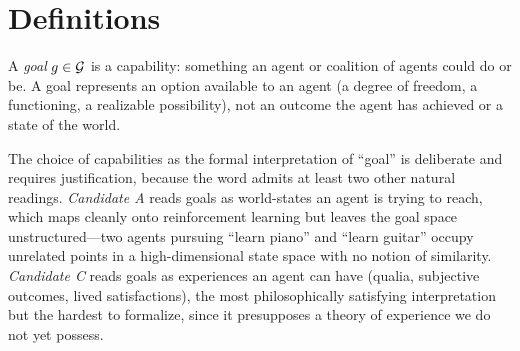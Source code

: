 %
%
%

\section{Definitions}
\label{sec:definitions}


\begin{definition}[Goal]
\label{def:goal}
A \emph{goal} $g \in \mathcal{G}$ is a capability: something an agent or coalition of
    agents could do or be. A goal represents an option available to an agent (a
    degree of freedom, a functioning, a realizable possibility), not an outcome
    the agent has achieved or a state of the world.
\end{definition}

The choice of capabilities as the formal interpretation of ``goal'' is
deliberate and requires justification, because the word admits at least two
other natural readings. \emph{Candidate A} reads goals as world-states an agent
is trying to reach, which maps cleanly onto reinforcement learning but leaves
the goal space unstructured---two agents pursuing ``learn piano'' and ``learn
guitar'' occupy unrelated points in a high-dimensional state space with no
notion of similarity. \emph{Candidate C} reads goals as experiences an agent
can have (qualia, subjective outcomes, lived satisfactions), the most
philosophically satisfying interpretation but the hardest to formalize, since
it presupposes a theory of experience we do not yet possess.

